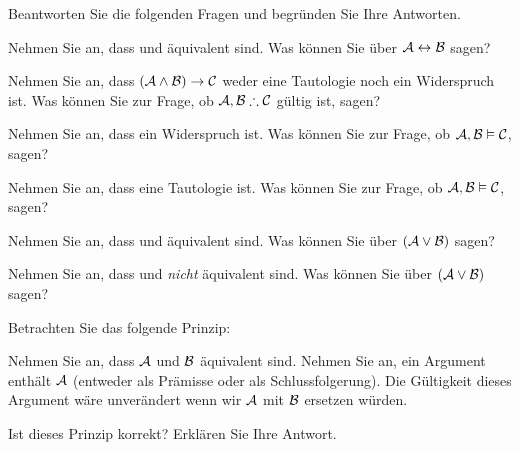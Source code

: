 \solutions
\problempart
\label{pr.TT.concepts}
Beantworten Sie die folgenden Fragen und begründen Sie Ihre Antworten.
\begin{earg}
\item Nehmen Sie an, dass  und  äquivalent sind. Was können Sie über $\mathcal{A}\leftrightarrow\mathcal{B}$ sagen?
\item Nehmen Sie an, dass $(\mathcal{A}\wedge\mathcal{B})\rightarrow\mathcal{C}$ weder eine Tautologie noch ein Widerspruch ist. Was können Sie zur Frage, ob $\metav{A}, \metav{B} \therefore\metav{C}$ gültig ist, sagen?
\item Nehmen Sie an, dass  ein Widerspruch ist. Was können Sie zur Frage, ob $\mathcal{A}, \mathcal{B} \vDash \mathcal{C}$, sagen?
\item Nehmen Sie an, dass  eine Tautologie ist. Was können Sie zur Frage, ob $\mathcal{A}, \mathcal{B}\vDash \mathcal{C}$, sagen?
\item Nehmen Sie an, dass  und  äquivalent sind. Was können Sie über $(\mathcal{A}\vee\mathcal{B})$ sagen?
\item Nehmen Sie an, dass  und  \emph{nicht} äquivalent sind. Was können Sie über $(\mathcal{A}\vee\mathcal{B})$ sagen?
\end{earg}
\problempart 
Betrachten Sie das folgende Prinzip:
	\begin{ebullet}
		\item Nehmen Sie an, dass $\mathcal{A}$ und $\mathcal{B}$ äquivalent sind. Nehmen Sie an, ein Argument enthält $\mathcal{A}$ (entweder als Prämisse oder als Schlussfolgerung). Die Gültigkeit dieses Argument wäre unverändert wenn wir $\mathcal{A}$ mit $\mathcal{B}$ ersetzen würden.
	\end{ebullet}
Ist dieses Prinzip korrekt? Erklären Sie Ihre Antwort.



